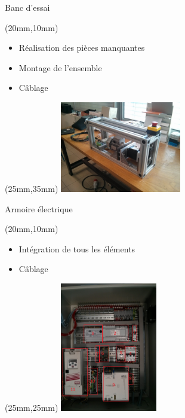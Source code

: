\documentclass[10pt]{beamer}
\begin{document}
	\begin{frame}{Banc d'essai}
		
		\begin{textblock*}{80mm}(20mm,10mm)
			\begin{itemize}
				\item Réalisation des pièces manquantes
				\item Montage de l'ensemble
				\item Câblage
 			\end{itemize}
		\end{textblock*}

		\begin{textblock*}{80mm}(25mm,35mm)
				\includegraphics[width=200px]{IMG_20160628_183017.jpg}
		\end{textblock*}
		
	\end{frame}

	\begin{frame}{Armoire électrique}
		
		\begin{textblock*}{80mm}(20mm,10mm)
			\begin{itemize}
				\item Intégration de tous les éléments
				\item Câblage
 			\end{itemize}
		\end{textblock*}

		\begin{textblock*}{80mm}(25mm,25mm)
				\includegraphics[width=160px]{IMG_20160629_193634.jpg}
		\end{textblock*}
		
	\end{frame}
\end{document}
